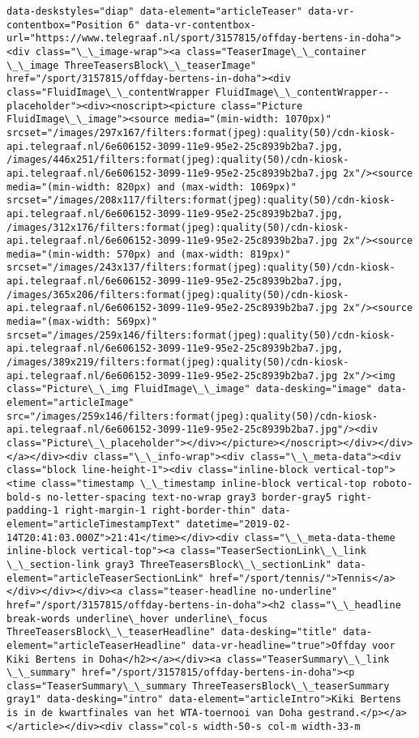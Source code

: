 \documentclass[11pt]{article}
\begin{document}
\begin{Verbatim}[commandchars=\\\{\}]
data-deskstyles="diap" data-element="articleTeaser" data-vr-contentbox="Position 6" data-vr-contentbox-url="https://www.telegraaf.nl/sport/3157815/offday-bertens-in-doha"><div class="\_\_image-wrap"><a class="TeaserImage\_\_container \_\_image ThreeTeasersBlock\_\_teaserImage" href="/sport/3157815/offday-bertens-in-doha"><div class="FluidImage\_\_contentWrapper FluidImage\_\_contentWrapper--placeholder"><div><noscript><picture class="Picture FluidImage\_\_image"><source media="(min-width: 1070px)" srcset="/images/297x167/filters:format(jpeg):quality(50)/cdn-kiosk-api.telegraaf.nl/6e606152-3099-11e9-95e2-25c8939b2ba7.jpg, /images/446x251/filters:format(jpeg):quality(50)/cdn-kiosk-api.telegraaf.nl/6e606152-3099-11e9-95e2-25c8939b2ba7.jpg 2x"/><source media="(min-width: 820px) and (max-width: 1069px)" srcset="/images/208x117/filters:format(jpeg):quality(50)/cdn-kiosk-api.telegraaf.nl/6e606152-3099-11e9-95e2-25c8939b2ba7.jpg, /images/312x176/filters:format(jpeg):quality(50)/cdn-kiosk-api.telegraaf.nl/6e606152-3099-11e9-95e2-25c8939b2ba7.jpg 2x"/><source media="(min-width: 570px) and (max-width: 819px)" srcset="/images/243x137/filters:format(jpeg):quality(50)/cdn-kiosk-api.telegraaf.nl/6e606152-3099-11e9-95e2-25c8939b2ba7.jpg, /images/365x206/filters:format(jpeg):quality(50)/cdn-kiosk-api.telegraaf.nl/6e606152-3099-11e9-95e2-25c8939b2ba7.jpg 2x"/><source media="(max-width: 569px)" srcset="/images/259x146/filters:format(jpeg):quality(50)/cdn-kiosk-api.telegraaf.nl/6e606152-3099-11e9-95e2-25c8939b2ba7.jpg, /images/389x219/filters:format(jpeg):quality(50)/cdn-kiosk-api.telegraaf.nl/6e606152-3099-11e9-95e2-25c8939b2ba7.jpg 2x"/><img class="Picture\_\_img FluidImage\_\_image" data-desking="image" data-element="articleImage" src="/images/259x146/filters:format(jpeg):quality(50)/cdn-kiosk-api.telegraaf.nl/6e606152-3099-11e9-95e2-25c8939b2ba7.jpg"/><div class="Picture\_\_placeholder"></div></picture></noscript></div></div></a></div><div class="\_\_info-wrap"><div class="\_\_meta-data"><div class="block line-height-1"><div class="inline-block vertical-top"><time class="timestamp \_\_timestamp inline-block vertical-top roboto-bold-s no-letter-spacing text-no-wrap gray3 border-gray5 right-padding-1 right-margin-1 right-border-thin" data-element="articleTimestampText" datetime="2019-02-14T20:41:03.000Z">21:41</time></div><div class="\_\_meta-data-theme inline-block vertical-top"><a class="TeaserSectionLink\_\_link \_\_section-link gray3 ThreeTeasersBlock\_\_sectionLink" data-element="articleTeaserSectionLink" href="/sport/tennis/">Tennis</a></div></div></div><a class="teaser-headline no-underline" href="/sport/3157815/offday-bertens-in-doha"><h2 class="\_\_headline break-words underline\_hover underline\_focus ThreeTeasersBlock\_\_teaserHeadline" data-desking="title" data-element="articleTeaserHeadline" data-vr-headline="true">Offday voor Kiki Bertens in Doha</h2></a></div><a class="TeaserSummary\_\_link \_\_summary" href="/sport/3157815/offday-bertens-in-doha"><p class="TeaserSummary\_\_summary ThreeTeasersBlock\_\_teaserSummary gray1" data-desking="intro" data-element="articleIntro">Kiki Bertens is in de kwartfinales van het WTA-toernooi van Doha gestrand.</p></a></article></div><div class="col-s width-50-s col-m width-33-m 
\end{Verbatim}
\end{document}
